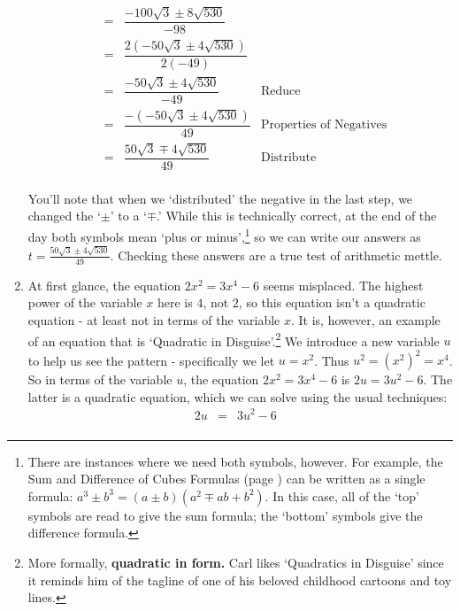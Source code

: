\documentclass{ximera}
\begin{document}
\begin{ex}
\begin{enumerate}
\[\begin{array}{rclr}
& = &  \dfrac{-100\sqrt{3} \pm 8\sqrt{530}}{-98}  & \\ [10pt]

& = &  \dfrac{2(-50\sqrt{3} \pm 4\sqrt{530})}{2(-49)}  & \\ [10pt]

& = &  \dfrac{-50\sqrt{3} \pm 4\sqrt{530}}{-49}  & \text{Reduce} \\ [10pt]

& = &  \dfrac{-(-50\sqrt{3} \pm 4\sqrt{530})}{49}  & \text{Properties of Negatives} \\ [10pt]

& = & \dfrac{50\sqrt{3} \mp 4\sqrt{530}}{49} & \text{Distribute} \\ 

\end{array}\]

You'll note that when we `distributed' the negative in the last step, we changed the `$\pm$' to a `$\mp$.'  While this is technically correct, at the end of the day both symbols mean `plus or minus',\footnote{There are instances where we need both symbols, however.  For example, the Sum and Difference of Cubes Formulas (page \pageref{CommonFactoringFormulas}) can be written as a single formula:  $a^3 \pm b^3 = (a \pm b) (a^2 \mp ab + b^2)$.  In this case, all of the `top' symbols are read to give the sum formula;  the `bottom' symbols give the difference formula.} so we can write our answers as $t =  \frac{50\sqrt{3} \pm 4\sqrt{530}}{49}$. Checking these answers are a true test of arithmetic mettle.

\item At first glance, the equation $2x^2 = 3x^4 - 6$ seems misplaced.  The highest power of the variable $x$ here is $4$, not $2$, so this equation isn't a quadratic equation - at least not in terms of the variable $x$.  It is, however, an example of an equation that is `Quadratic in Disguise'.\footnote{More formally, \textbf{quadratic in form.} Carl likes `Quadratics in Disguise' since it reminds him of the tagline of one of his beloved childhood cartoons and toy lines.} We introduce a new variable $u$ to help us see the pattern - specifically we let $u = x^2$.  Thus $u^2 = (x^2)^2 = x^4$.  So in terms of the variable $u$, the equation $2x^2 = 3x^4 - 6$ is $2u = 3u^2 - 6$.  The latter is a quadratic equation, which we can solve using the usual techniques:\[ \begin{array}{rclr}

2u & = & 3u^2 - 6 & \\


\end{array}\]
\end{enumerate}
\end{ex}
\end{document}
